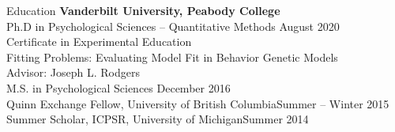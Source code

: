 \begin{rSection}{\textrm{Education}}
{\bf Vanderbilt University, Peabody College}\\
Ph.D in Psychological Sciences -- Quantitative Methods \hfill{August 2020}\\%
\hspace*{\pindent}Certificate in Experimental Education\\%
\hspace*{\pindent}Fitting Problems: Evaluating Model Fit in Behavior Genetic Models\\
\hspace*{\pindent}Advisor: Joseph L. Rodgers%
\smallskip\\
M.S. in Psychological Sciences \hfill{December 2016} \\
\hspace*{\pindent}Quinn Exchange Fellow, University of British Columbia\hfill{Summer – Winter 2015}\\
\hspace*{\pindent}Summer Scholar, ICPSR, University of Michigan\hfill{Summer 2014}%
\medskip\\

\end{rSection}
